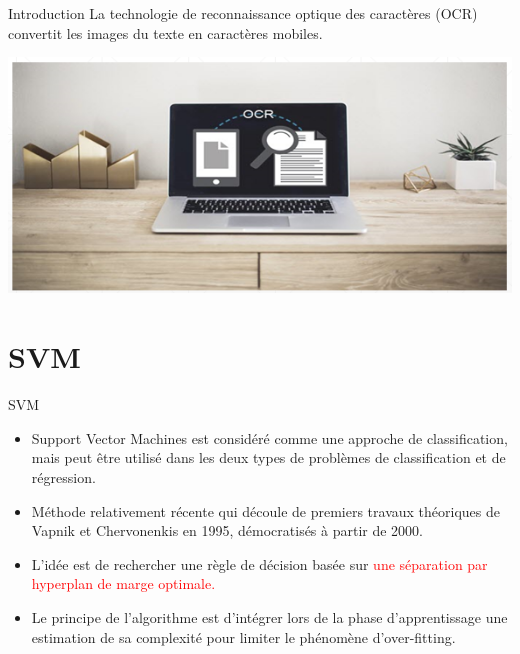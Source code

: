 \documentclass{bredelebeamer}
\begin{document}
\begin{frame}{Introduction}
La technologie de reconnaissance optique des caractères (OCR) convertit les images du texte en caractères mobiles.
\vfill
\begin{center} \includegraphics[scale=0.6]{2.png} \end{center}
\vfill
 \end{frame}  
 
\section{ SVM}
\begin{frame}{SVM}	
\begin{itemize}
		\item Support Vector Machines est considéré comme une approche de classification, mais peut être utilisé dans les deux types de problèmes de classification et de régression.
		\item Méthode relativement récente qui découle de premiers travaux théoriques de Vapnik et Chervonenkis en 1995, démocratisés à partir de 2000.
		\item L’idée est de rechercher une règle de décision basée sur \textcolor{red}{une séparation par hyperplan de marge optimale.}
		\item Le principe de l’algorithme est d’intégrer lors de la phase d’apprentissage une estimation de sa complexité pour limiter le phénomène d’over-fitting.
	\end{itemize}
   \end{frame}
   
\end{document}
